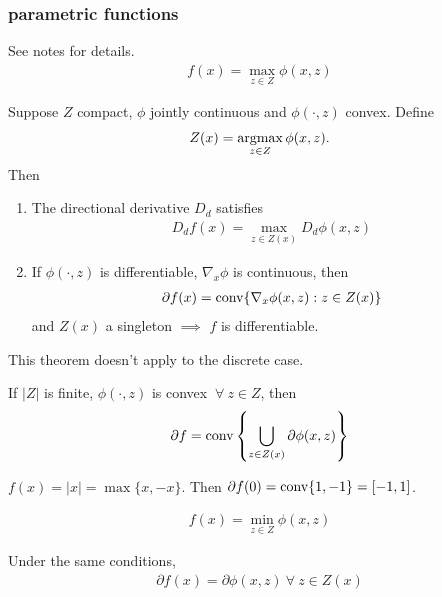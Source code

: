 \documentclass[class=article,crop=false]{standalone}
\begin{document}
\subsubsection{parametric functions}
See notes for details.
\begin{align*}
	f(x) = \max_{z \in Z} \phi(x,z)
\end{align*}
\begin{thm}[Danskin]
	Suppose $ Z$ compact,  $ \phi$ jointly continuous and $ \phi( \cdot ,z)$ convex. Define
	\begin{align*}
		Z(x) = \operatorname*{argmax}_{z \in Z} \phi(x,z).
	\end{align*}
	Then
	\begin{enumerate}[label=(\arabic*)]
		\item The directional derivative $ D_d$ satisfies
			 \begin{align*}
				 D_d f(x) = \max_{z \in Z(x)} D_d \phi(x,z)
			\end{align*}
		\item If $ \phi( \cdot ,z)$ is differentiable, $ \nabla _x \phi$ is continuous, then
			\begin{align*}
				\partial f(x) = \operatorname{conv} \{\nabla _x \phi(x,z): z \in Z(x)\} 
			\end{align*}
			and $ Z(x)$ a singleton  $ \implies$ $ f$ is differentiable.
	\end{enumerate}
\end{thm}
\begin{note}
This theorem doesn't apply to the discrete case.
\end{note}
\begin{thm}
	If $ |Z|$ is finite,  $ \phi( \cdot ,z)$ is convex $ \ \forall \ z \in Z$, then
	\begin{align*}
		\partial f = \operatorname{conv} \left\{ \bigcup_{ z \in Z(x)} \partial \phi(x,z) \right\} 
	\end{align*}
\end{thm}
\begin{eg}
	$ f(x) = |x| = \max \{x,-x\} $. Then $ \partial f(0) = \operatorname{conv} \{1,-1\} = [-1,1] $.
\end{eg}

\begin{align*}
	f(x) = \min_{z \in Z} \phi(x,z)
\end{align*}
\begin{thm}
Under the same conditions,
\begin{align*}
	\partial f(x) = \partial \phi(x,z) \ \forall \ z \in Z(x)
\end{align*}
\end{thm}
\end{document}
